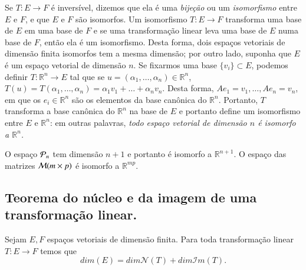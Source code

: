 Se $T:E\to F$ é inversível, dizemos que ela é uma \emph{bijeção} ou um \emph{isomorfismo} entre $E$ e $F$, e que $E$ e $F$ são isomorfos. Um isomorfismo $T:E\rightarrow F$ transforma uma base de $E$ em uma base de $F$ e se uma transformação linear leva uma base de $E$ numa base de $F$, então ela é um isomorfismo. Desta forma, dois espaços vetoriais de dimensão finita isomorfos tem a mesma dimensão; por outro lado, suponha que $E$ é um espaço vetorial de dimensão $n$. Se fixarmos uma base $\{v_i\} \subset E$, podemos definir $T:{\mathbb{R}}^n \rightarrow E$ tal que se $u=(\alpha_1,\ldots,\alpha_n)\in {\mathbb{R}}^n$, $T(u) = T(\alpha_1,\ldots,\alpha_n)=\alpha_1v_1+\ldots+\alpha_nv_n$. Desta forma, $Ae_1=v_1,\ldots,Ae_n=v_n$, em que os $e_i \in {\mathbb{R}}^n$ são os elementos da base canônica do ${\mathbb{R}}^n$. Portanto, $T$ transforma a base canônica do ${\mathbb{R}}^n$ na base de $E$ e portanto define um isomorfismo entre $E$ e ${\mathbb{R}}^n$: em outras palavras, \emph{todo espaço vetorial de dimensão $n$ é isomorfo a ${\mathbb{R}}^n$.}

\begin{exemplo}
    O espaço ${\cal{P}}_n$ tem dimensão $n+1$ e portanto é isomorfo a ${\mathbb{R}}^{n+1}$. O espaço das matrizes ${\cal{M}}(m\times p)$ é isomorfo a ${\mathbb{R}}^{mp}$.
\end{exemplo}

\subsection{Teorema do núcleo e da imagem de uma transformação linear.}

\begin{teo}
    Sejam $E,F$ espaços vetoriais de dimensão finita. Para toda transformação linear $T:E\rightarrow F$ temos que 
    \begin{equation*}
        dim(E) = dim{\mathcal{N}}(T)+dim{\mathcal{I}}m(T).
    \end{equation*}
\end{teo}

